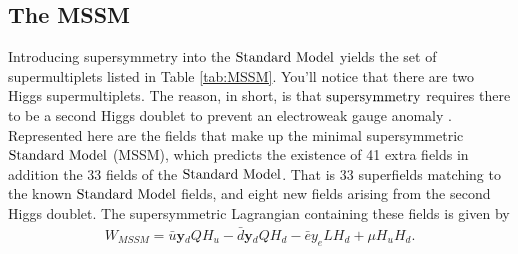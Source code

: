 \subsection{The MSSM}
\label{sec:mssm}
Introducing supersymmetry into the $\text{Standard\ Model}$ yields the set of supermultiplets listed in Table \ref{tab:MSSM}. You'll notice that there are two Higgs supermultiplets. The reason, in short, is that $\text{supersymmetry}$ requires there to be a second Higgs doublet to prevent an electroweak gauge anomaly \cite{Martin:1997ns}. Represented here are the fields that make up the minimal supersymmetric $\text{Standard\ Model}$ (MSSM), which predicts the existence of 41 extra fields in addition the 33 fields of the $\text{Standard\ Model}$. That is 33 superfields matching to the known $\text{Standard\ Model}$ fields, and eight new fields arising from the second Higgs doublet. The supersymmetric Lagrangian containing these fields is given by
\begin{align}
W_{MSSM}=\bar{u}\textbf{y$_d$}QH_u-\bar{d}\textbf{y$_d$}QH_d-\bar{e}y_eLH_d+\mu H_uH_d.
\end{align}

